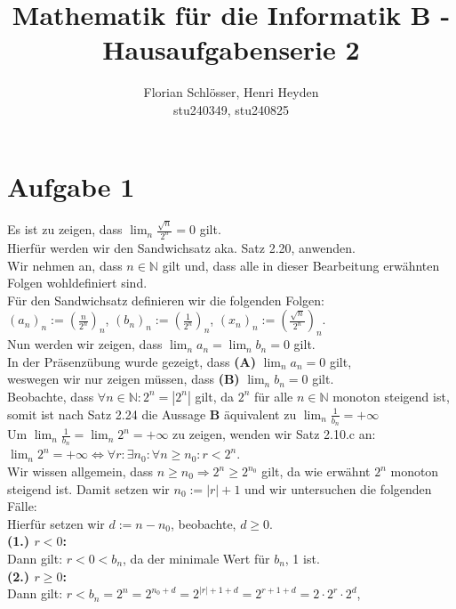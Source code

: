\documentclass[12pt, a4paper]{article}
\title{Mathematik für die Informatik B - Hausaufgabenserie 2}
\author{Florian Schlösser, Henri Heyden \\ \small stu240349, stu240825}
\date{}
\begin{document}
\maketitle

\doublespacing
\section*{Aufgabe 1}
Es ist zu zeigen, dass $\lim_{n}\frac{\sqrt{n}}{2^n} = 0$ gilt. \\
Hierfür werden wir den Sandwichsatz aka. Satz 2.20, anwenden. \\
Wir nehmen an, dass $n \in \mathbb{N}$ gilt und, dass alle in dieser Bearbeitung erwähnten Folgen wohldefiniert sind. \\
Für den Sandwichsatz definieren wir die folgenden Folgen: \\ $(a_n)_n := \left(\frac{n}{2^n}\right)_n$, $(b_n)_n := \left(\frac{1}{2^n}\right)_n$, $(x_n)_n := \left(\frac{\sqrt{n}}{2^n}\right)_n$.\\
Nun werden wir zeigen, dass $\lim_{n}a_n = \lim_{n}b_n = 0$ gilt. \\
In der Präsenzübung wurde gezeigt, dass \textbf{(A)} $\lim_{n}a_n = 0$ gilt, \\
weswegen wir nur zeigen müssen, dass \textbf{(B)} $\lim_{n}b_n = 0$ gilt. \\
Beobachte, dass $\forall n \in \mathbb N: 2^n = |2^n|$ gilt, da $2^n$ für alle $n \in \mathbb N$ monoton steigend ist, somit ist nach Satz 2.24 die Aussage \textbf{B} äquivalent zu $\lim_{n}\frac{1}{b_n} = +\infty$ \\
Um $\lim_{n}\frac{1}{b_n} = \lim_{n}2^n = +\infty$ zu zeigen, wenden wir Satz 2.10.c an: \\
$\lim_{n}2^n = +\infty \Longleftrightarrow \forall r: \exists n_0: \forall n \ge n_0: r < 2^n$. \\
Wir wissen allgemein, dass $n \ge n_0 \Rightarrow 2^n \ge 2^{n_0}$ gilt, da wie erwähnt $2^n$ monoton steigend ist.
Damit setzen wir $n_0 := |r| + 1$ und wir untersuchen die folgenden Fälle:\\
Hierfür setzen wir $d:= n - n_0$, beobachte, $d \ge 0$. \\
\textbf{(1.) $r < 0$:} \\
Dann gilt: $r < 0 < b_n$, da der minimale Wert für $b_n$, 1 ist. \\
\textbf{(2.) $r \ge 0$:} \\
Dann gilt: $r < b_n = 2^{n} = 2^{n_0 + d} = 2^{|r| + 1 + d} = 2^{r + 1 + d} = 2 \cdot 2^r \cdot 2^d$, \\
\end{document}
